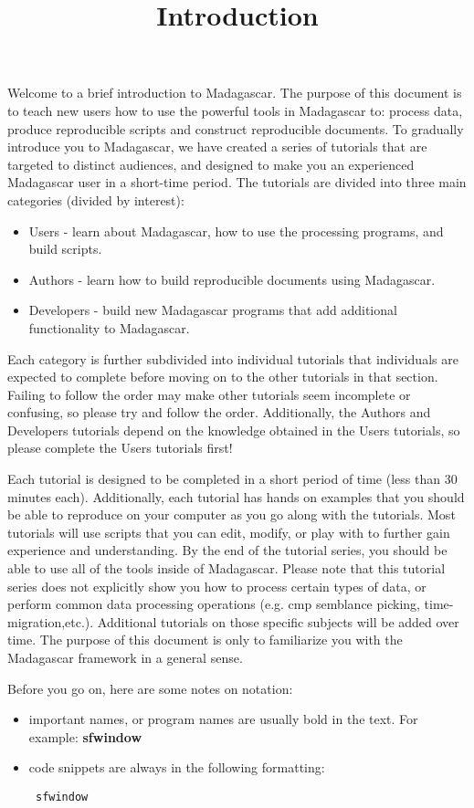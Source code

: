 \title{Introduction}
Welcome to a brief introduction to Madagascar.  The purpose of this document is to teach new users how to use the powerful tools in Madagascar to: process data, produce reproducible scripts and construct reproducible documents.  
To gradually introduce you to Madagascar, we have created a series of tutorials that are targeted to distinct audiences, and designed to make you an experienced Madagascar user in a short-time period.  The tutorials are divided into three main categories (divided by interest):
\begin{itemize}
    \item Users - learn about Madagascar, how to use the processing programs, and build scripts.
    \item Authors - learn how to build reproducible documents using Madagascar.
    \item Developers - build new Madagascar programs that add additional functionality to Madagascar.
\end{itemize}
Each category is further subdivided into individual tutorials that individuals are expected to complete before moving on to the other tutorials in that section.  Failing to follow the order may make other tutorials seem incomplete or confusing, so please try and follow the order.  Additionally, the Authors and Developers tutorials depend on the knowledge obtained in the Users tutorials, so please complete the Users tutorials first!

Each tutorial is designed to be completed in a short period of time (less than 30 minutes each).  Additionally, each tutorial has hands on examples that you should be able to reproduce on your computer as you go along with the tutorials.  Most tutorials will use scripts that you can edit, modify, or play with to further gain experience and understanding.  By the end of the tutorial series, you should be able to use all of the tools inside of Madagascar.  Please note that this tutorial series does not explicitly show you how to process certain types of data, or perform common data processing operations (e.g. cmp semblance picking, time-migration,etc.).  Additional tutorials on those specific subjects will be added over time.  The purpose of this document is only to familiarize you with the Madagascar framework in a general sense.

Before you go on, here are some notes on notation:
\begin{itemize}
    \item important names, or program names are usually bold in the text.  For example: \textbf{sfwindow}
    \item code snippets are always in the following formatting: \begin{verbatim} sfwindow \end{verbatim}
\end{itemize}
